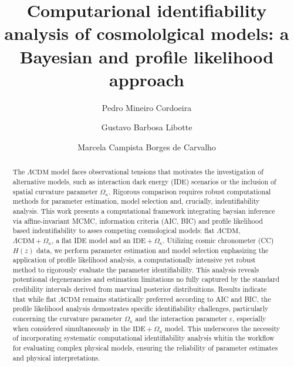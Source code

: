 \documentclass[final,3p,times]{elsarticle}
\begin{document}
\begin{frontmatter}

\title{Computarional identifiability analysis of cosmololgical models: a Bayesian and profile likelihood approach}


\author[UERJ - IPRJ]{Pedro Mineiro Cordoeira} %

\author[UERJ - IPRJ]{Gustavo Barbosa Libotte}

\author[UFRJ - IP]{Marcela Campista Borges de Carvalho}



\begin{abstract}

The $\Lambda\text{CDM}$ model faces observational tensions that motivates the investigation of alternative models, such as interaction dark energy (IDE) scenarios or the inclusion of spatial curvature parameter $\Omega_{\kappa}$. Rigorous comparison requires robust computational methods for parameter estimation, model selection and, crucially, indentifiability analysis. This work presents a computational framework integrating baysian inference via affine-invariant MCMC, information criteria (AIC, BIC) and profile likelihood based indentifiability to asses competing cosmological models: flat $\Lambda \text{CDM}$, $\Lambda\text{CDM} + \Omega_{\kappa}$, a flat IDE model and an $\text{IDE}+\Omega_{\kappa}$. Utilizing cosmic chronometer (CC) $H(z)$ data, we perform parameter estimation and model selection enphasizing the application of profile likelihood analysis, a computationally intensive yet robust method to rigorously evaluate the parameter identifiability. This analysis reveals potentional degenerancies and estimation limitations no fully captured by the standard credibility intervals derived from marvinal posterior distribuitions. Results indicate that while flat $\Lambda\text{CDM}$ remains statistically preferred according to AIC and BIC, the profile likelihood analysis demostrates specific identifiability challenges, particularly concerning the curvature parameter $\Omega_{\kappa}$ and the interaction parameter $\varepsilon$, especially when considered simultaneously in the $\text{IDE}+\Omega_{\kappa}$ model. This underscores the necessity of incorporating systematic computational identifiability analysis whitin the workflow for evaluating complex physical models, ensuring the reliability of parameter estimates and physical interpretations.


\end{abstract}
\end{frontmatter}
\end{document}
